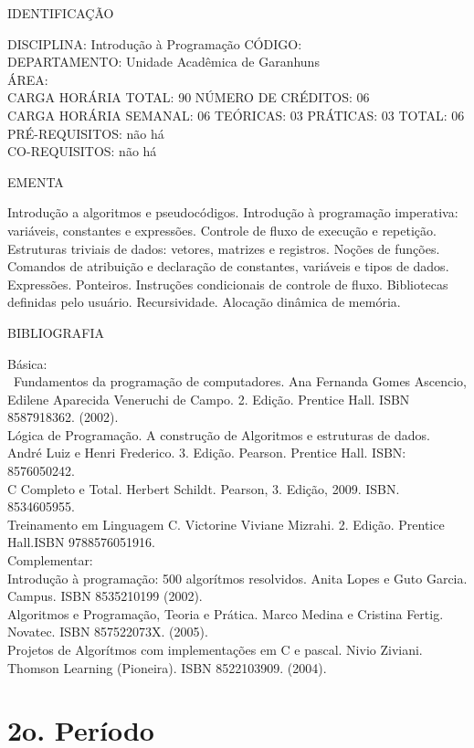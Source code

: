 \documentclass[
	12pt,				%
	openright,			%
  oneside,     %
	a4paper,			%
	english,			%
	french,				%
	spanish,			%
	brazil				%
	]{abntex2}
\begin{document}
\begin{apendicesenv}
\newpage IDENTIFICAÇÃO

DISCIPLINA: Introdução à Programação CÓDIGO:\\
DEPARTAMENTO: Unidade Acadêmica de Garanhuns\\
ÁREA: \\
CARGA HORÁRIA TOTAL: 90 NÚMERO DE CRÉDITOS: 06\\
CARGA HORÁRIA SEMANAL: 06 TEÓRICAS: 03 PRÁTICAS: 03 TOTAL: 06\\
PRÉ-REQUISITOS: não há\\
CO-REQUISITOS: não há

EMENTA 

Introdução a algoritmos e pseudocódigos. Introdução à programação
imperativa: variáveis, constantes e expressões. Controle de fluxo de
execução e repetição. Estruturas triviais de dados: vetores, matrizes e
registros. Noções de funções. Comandos de atribuição e declaração de
constantes, variáveis e tipos de dados. Expressões. Ponteiros.
Instruções condicionais de controle de fluxo. Bibliotecas definidas
pelo usuário. Recursividade. Alocação dinâmica de memória.

BIBLIOGRAFIA 

Básica:\\\
Fundamentos da programação de computadores. Ana Fernanda Gomes Ascencio,
Edilene Aparecida Veneruchi de Campo. 2. Edição. Prentice Hall. ISBN
8587918362. (2002).\\
Lógica de Programação. A construção de Algoritmos e estruturas de dados.
André Luiz e Henri Frederico. 3. Edição. Pearson. Prentice Hall. ISBN:
8576050242.\\
C Completo e Total. Herbert Schildt. Pearson, 3. Edição, 2009. ISBN.
8534605955.\\
Treinamento em Linguagem C. Victorine Viviane Mizrahi. 2. Edição.
Prentice Hall.ISBN 9788576051916.\\
Complementar:\\
Introdução à programação: 500 algorítmos resolvidos. Anita Lopes e Guto
Garcia. Campus. ISBN 8535210199 (2002).\\
Algoritmos e Programação, Teoria e Prática. Marco Medina e Cristina
Fertig. Novatec. ISBN 857522073X. (2005).\\
Projetos de Algorítmos com implementações em C e pascal. Nivio Ziviani.
Thomson Learning (Pioneira). ISBN 8522103909. (2004).\\
\newpage

\section*{2o. Período}


\end{apendicesenv}
\end{document}
